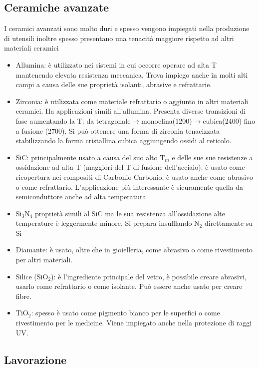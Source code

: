 \subsection{Ceramiche avanzate}

I ceramici avanzati sono molto duri e spesso vengono impiegati nella produzione di utensili inoltre spesso presentano una tenacità maggiore rispetto ad altri materiali ceramici
\begin{itemize}
    \item Allumina: è utilizzato nei sistemi in cui occorre operare ad alta T mantenendo elevata resistenza meccanica, Trova impiego anche in molti alti campi a causa delle sue proprietà isolanti, abrasive e refrattarie.
    \item Zirconia: è utilizzata come materiale refrattario o aggiunto in altri materiali ceramici. Ha applicazioni simili all'allumina. Presenta diverse transizioni di fase aumentando la T: da tetragonale$\rightarrow$monoclina(1200)$\rightarrow$cubica(2400) fino a fusione (2700). Si può ottenere una forma di zirconia tenacizzata stabilizzando la forma cristallina cubica aggiungendo ossidi al reticolo.
    \item SiC: principalmente usato a causa del suo alto T$_m$ e delle sue sue resistenze a ossidazione ad alta T (maggiori del T di fusione dell'acciaio). è usato come ricopertura nei compositi di Carbonio-Carbonio, è usato anche come abrasivo o come refrattario. L'applicazione più interessante è sicuramente quella da semiconduttore anche ad alta temperatura.
    \item Si$_3$N$_4$ proprietà simili al SiC ma le sua resistenza all'ossidazione alte temperature è leggermente minore. Si prepara insufflando N$_2$ direttamente su Si
    \item Diamante: è usato, oltre che in gioielleria, come abrasivo o come rivestimento per altri materiali.
    \item Silice (SiO$_2$): è l'ingrediente principale del vetro, è possibile creare abrasivi, usarlo come refrattario o come isolante. Può essere anche usato per creare fibre.
    \item TiO$_2$: spesso è usato come pigmento bianco per le superfici o come rivestimento per le medicine. Viene impiegato anche nella protezione di raggi UV.
\end{itemize}

\subsection{Lavorazione}


